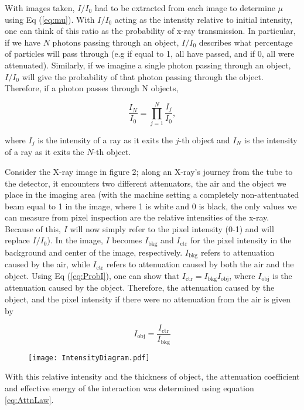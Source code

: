 With images taken, $I/I_0$ had to be extracted from each image to determine $\mu$ using Eq (\ref{eq:mu}). With $I/I_0$ acting as the intensity relative to initial intensity, one can think of this ratio as the probability of x-ray transmission. In particular, if we have $N$ photons passing through an object, $I/I_0$ describes what percentage of particles will pass through (e.g if equal to 1, all have passed, and if 0, all were attenuated). Similarly, if we imagine a single photon passing through an object, $I/I_0$ will give the probability of that photon passing through the object. Therefore, if a photon passes through N objects, 

\begin{equation}
    \frac{I_N}{I_0} = \prod_{j=1}^{N} \frac{I_j}{I_0},
   \label{eq:ProbI}
\end{equation}

where $I_j$ is the intensity of a ray as it exits the $j$-th object and $I_N$ is the intensity of a ray as it exits the $N$-th object.

Consider the X-ray image in figure 2; along an X-ray's journey from the tube to the detector, it encounters two different attenuators, the air and the object we place in the imaging area (with the machine setting a completely non-attentuated beam equal to 1 in the image, where 1 is white and 0 is black, the only values we can measure from pixel inspection are the relative intensities of the x-ray. Because of this, $I$ will now simply refer to the pixel intensity (0-1) and will replace $I/I_0$). In the image, $I$ becomes $I_{\text{bkg}}$ and $I_{\text{ctr}}$ for the pixel intensity in the background and center of the image, respectively. $I_{\text{bkg}}$ refers to attenuation caused by the air, while $I_{\text{ctr}}$ refers to attenuation caused by both the air and the object. Using Eq (\ref{eq:ProbI}), one can show that $I_{\text{ctr}} = I_{\text{bkg}} I_{\text{obj}}$, where $I_{\text{obj}}$ is the attenuation caused by the object. Therefore, the attenuation caused by the object, and the pixel intensity if there were no attenuation from the air is given by

\begin{equation}
    I_{\text{obj}} = \frac{I_{\text{ctr}}}{I_{\text{bkg}}}
\label{eq:IObj}
\end{equation}

\begin{figure}[H]
    \centering
	\texttt{[image: IntensityDiagram.pdf]}
	\label{figure:IntensityDiagram}
	\caption{}
\end{figure}

With this relative intensity and the thickness of object, the attenuation coefficient and effective energy of the interaction was determined using equation \ref{eq:AttnLaw}.